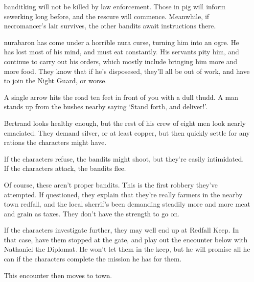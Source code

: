 \begin{multicols}{2}
\Gls{banditking} will not be killed by law enforcement.  Those in \gls{pig} will inform \gls{sewerking} long before, and the rescure will commence.  Meanwhile, if \gls{necromancer}'s lair survives, the other bandits await instructions there.

\label{desperatemeasures}

\gls{nurabaron} has come under a horrible nura curse, turning him into an ogre.  He has lost most of his mind, and must eat constantly.  His servants pity him, and continue to carry out his orders, which mostly include bringing him more and more food.  They know that if he's disposesed, they'll all be out of work, and have to join the Night Guard, or worse.


\begin{boxtext}
A single arrow hits the road ten feet in front of you with a dull thudd.  A man stands up from the bushes nearby saying `Stand forth, and deliver!'.
\end{boxtext}

Bertrand looks healthy enough, but the rest of his crew of eight men look nearly emaciated.  They demand silver, or at least copper, but then quickly settle for any rations the characters might have.

If the characters refuse, the bandits might shoot, but they're easily intimidated.  If the characters attack, the bandits flee.

Of course, these aren't proper bandits.  This is the first robbery they've attempted.  If questioned, they explain that they're really farmers in the nearby town \gls{redfall}, and the local sherrif's been demanding steadily more and more meat and grain as taxes.  They don't have the strength to go on.

\humansoldier


If the characters investigate further, they may well end up at Redfall Keep.  In that case, have them stopped at the gate, and play out the encounter below with Nathaniel the Diplomat.  He won't let them in the keep, but he will promise all he can if the characters complete the mission he has for them.

This encounter then moves to town.


\end{multicols}
